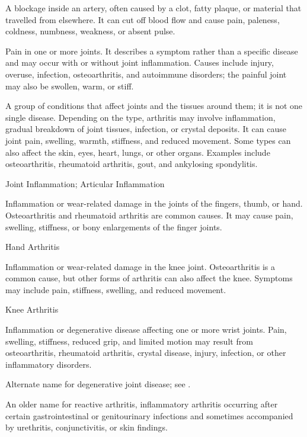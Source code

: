  A blockage inside an artery, often caused by a clot, fatty plaque, or material that travelled from elsewhere. It can cut off blood flow and cause pain, paleness, coldness, numbness, weakness, or absent pulse.

 Pain in one or more joints. It describes a symptom rather than a
specific disease and may occur with or without joint inflammation. Causes include injury,
overuse, infection, osteoarthritis, and autoimmune disorders; the painful joint may also
be swollen, warm, or stiff.

 A group of conditions that affect joints and the tissues around them; it is not one single disease. Depending on the type, arthritis may involve inflammation, gradual breakdown of joint tissues, infection, or crystal deposits. It can cause joint pain, swelling, warmth, stiffness, and reduced movement. Some types can also affect the skin, eyes, heart, lungs, or other organs. Examples include osteoarthritis, rheumatoid arthritis, gout, and ankylosing spondylitis.

\synonyms
Joint Inflammation; Articular Inflammation

 Inflammation or wear-related damage in the
joints of the fingers, thumb, or hand. Osteoarthritis and rheumatoid
arthritis are common causes. It may cause pain, swelling, stiffness, or
bony enlargements of the finger joints.

\synonyms
Hand Arthritis

 Inflammation or wear-related damage in the knee
joint. Osteoarthritis is a common cause, but other forms of arthritis can
also affect the knee. Symptoms may include pain, stiffness, swelling, and
reduced movement.

\synonyms
Knee Arthritis

 Inflammation or degenerative disease affecting one or more wrist joints. Pain, swelling, stiffness, reduced grip, and limited motion may result from osteoarthritis, rheumatoid arthritis, crystal disease, injury, infection, or other inflammatory disorders.

 Alternate name for degenerative joint disease; see .

 An older name for reactive arthritis, inflammatory arthritis occurring after certain gastrointestinal or genitourinary infections and sometimes accompanied by urethritis, conjunctivitis, or skin findings.

